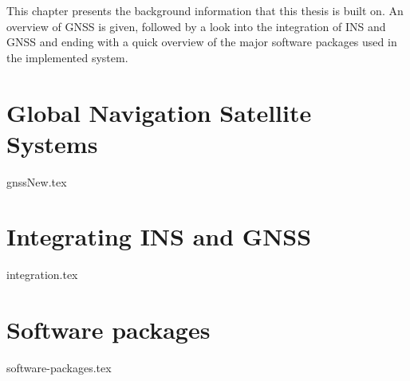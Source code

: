 \graphicspath{{Theory/}}
This chapter presents the background information that this thesis is built on. An overview of GNSS is given, followed by a look into the integration of INS and GNSS and ending with a quick overview of the major software packages used in the implemented system. 

\section{Global Navigation Satellite Systems}
    {gnssNew.tex}

\section{Integrating INS and GNSS}
    {integration.tex}

\section{Software packages}
    {software-packages.tex}
    
    